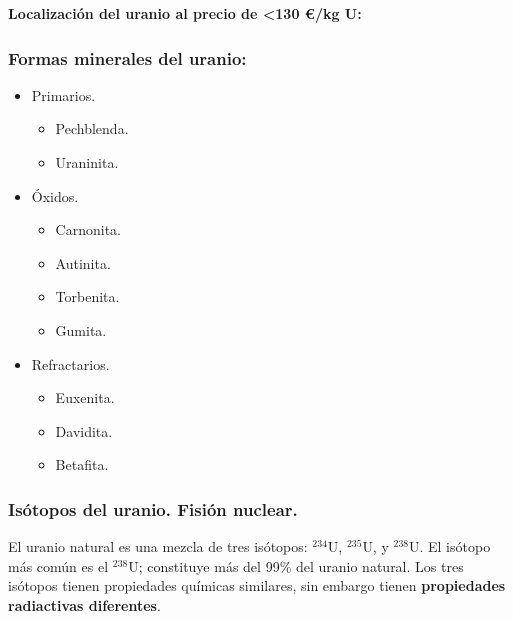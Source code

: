 			\textbf{Localización del uranio al precio de <130 €/kg U:}
			\begin{center}
			\end{center}
			
		\subsubsection{Formas minerales del uranio:}
			\begin{itemize}
				\item Primarios.
					\begin{itemize}
						\item Pechblenda.
						\item Uraninita.
					\end{itemize}
				\item Óxidos.
					\begin{itemize}
						\item Carnonita.
						\item Autinita.
						\item Torbenita.
						\item Gumita.
					\end{itemize}
				\item Refractarios.
					\begin{itemize}
						\item Euxenita.
						\item Davidita.
						\item Betafita.
					\end{itemize}
			\end{itemize}
			
		\subsubsection{Isótopos del uranio. Fisión nuclear.}
			El uranio natural es una mezcla de tres isótopos: $^{234}$U, $^{235}$U, y $^{238}$U. El isótopo más común es el $^{238}$U;
			constituye más del 99\% del uranio natural. Los tres isótopos tienen propiedades químicas similares, sin embargo tienen \textbf{propiedades radiactivas diferentes}.
			

